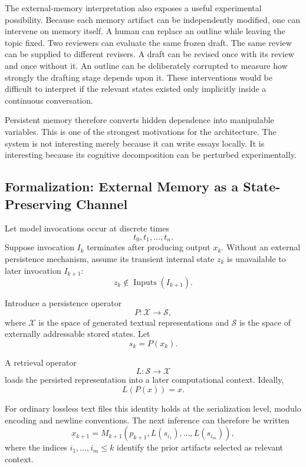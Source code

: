 \documentclass[11pt]{article}
\begin{document}
The external-memory interpretation also exposes a useful experimental possibility. Because each memory artifact can be independently modified, one can intervene on memory itself. A human can replace an outline while leaving the topic fixed. Two reviewers can evaluate the same frozen draft. The same review can be supplied to different revisers. A draft can be revised once with its review and once without it. An outline can be deliberately corrupted to measure how strongly the drafting stage depends upon it. These interventions would be difficult to interpret if the relevant states existed only implicitly inside a continuous conversation.

Persistent memory therefore converts hidden dependence into manipulable variables. This is one of the strongest motivations for the architecture. The system is not interesting merely because it can write essays locally. It is interesting because its cognitive decomposition can be perturbed experimentally.


\subsection{Formalization: External Memory as a State-Preserving Channel}

Let model invocations occur at discrete times
\[
    t_0,t_1,\ldots,t_n.
\]
Suppose invocation \(I_k\) terminates after producing output \(x_k\). Without an external persistence mechanism, assume its transient internal state \(z_k\) is unavailable to later invocation \(I_{k+1}\):
\[
    z_k \notin \operatorname{Inputs}(I_{k+1}).
\]

Introduce a persistence operator
\[
    P:\mathcal{X}\rightarrow\mathcal{S},
\]
where \(\mathcal{X}\) is the space of generated textual representations and \(\mathcal{S}\) is the space of externally addressable stored states. Let
\[
    s_k=P(x_k).
\]

A retrieval operator
\[
    L:\mathcal{S}\rightarrow\mathcal{X}
\]
loads the persisted representation into a later computational context. Ideally,
\[
    L(P(x))=x.
\]

For ordinary lossless text files this identity holds at the serialization level, modulo encoding and newline conventions. The next inference can therefore be written
\[
    x_{k+1}
    =
    M_{k+1}
    \left(
        p_{k+1},
        L(s_{i_1}),
        \ldots,
        L(s_{i_m})
    \right),
\]
where the indices \(i_1,\ldots,i_m\leq k\) identify the prior artifacts selected as relevant context.
\end{document}
